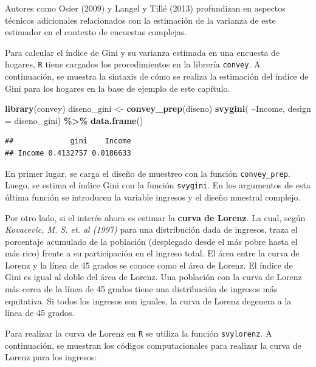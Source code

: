 \documentclass[
  spanish,
  12pt,
]{book}
\newenvironment{Shaded}{\begin{snugshade}}{\end{snugshade}}
\newcommand{\AttributeTok}[1]{\textcolor[rgb]{0.13,0.29,0.53}{#1}}
\newcommand{\FunctionTok}[1]{\textcolor[rgb]{0.13,0.29,0.53}{\textbf{#1}}}
\newcommand{\NormalTok}[1]{#1}
\newcommand{\OtherTok}[1]{\textcolor[rgb]{0.56,0.35,0.01}{#1}}
\newcommand{\SpecialCharTok}[1]{\textcolor[rgb]{0.81,0.36,0.00}{\textbf{#1}}}
\begin{document}
Autores como Osier (2009) y Langel y Tillé (2013) profundizan en aspectos técnicos adicionales relacionados con la estimación de la varianza de este estimador en el contexto de encuestas complejas.

Para calcular el índice de Gini y su varianza estimada en una encuesta de hogares, \texttt{R} tiene cargados los procedimientos en la librería \texttt{convey}. A continuación, se muestra la sintaxis de cómo se realiza la estimación del índice de Gini para los hogares en la base de ejemplo de este capítulo.

\begin{Shaded}
\begin{Highlighting}[]
\FunctionTok{library}\NormalTok{(convey)}
\NormalTok{ diseno\_gini }\OtherTok{\textless{}{-}} \FunctionTok{convey\_prep}\NormalTok{(diseno)}
\FunctionTok{svygini}\NormalTok{( }\SpecialCharTok{\textasciitilde{}}\NormalTok{Income, }\AttributeTok{design =}\NormalTok{ diseno\_gini) }\SpecialCharTok{\%\textgreater{}\%}
  \FunctionTok{data.frame}\NormalTok{()}
\end{Highlighting}
\end{Shaded}

\begin{verbatim}
##             gini    Income
## Income 0.4132757 0.0186633
\end{verbatim}

En primer lugar, se carga el diseño de muestreo con la función \texttt{convey\_prep}. Luego, se estima el índice Gini con la función \texttt{svygini}. En los argumentos de esta última función se introducen la variable ingresos y el diseño muestral complejo.

Por otro lado, si el interés ahora es estimar la \textbf{curva de Lorenz}. La cual, según \emph{Kovacevic, M. S. et. al (1997)} para una distribución dada de ingresos, traza el porcentaje acumulado de la población (desplegado desde el más pobre hasta el más rico) frente a su participación en el ingreso total. El área entre la curva de Lorenz y la línea de 45 grados se conoce como el área de Lorenz. El índice de Gini es igual al doble del área de Lorenz. Una población con la curva de Lorenz más cerca de la línea de 45 grados tiene una distribución de ingresos más equitativa. Si todos los ingresos son iguales, la curva de Lorenz degenera a la línea de 45 grados.

Para realizar la curva de Lorenz en \texttt{R} se utiliza la función \texttt{svylorenz}. A continuación, se muestran los códigos computacionales para realizar la curva de Lorenz para los ingresos:
\end{document}

